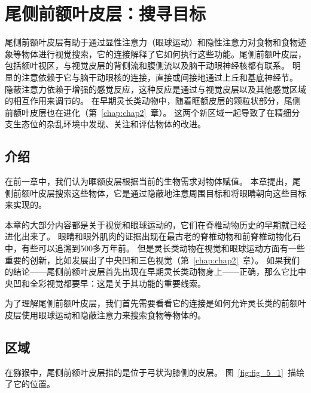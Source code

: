 \chapter{尾侧前额叶皮层：搜寻目标} \label{chap:chap5}

尾侧前额叶皮层有助于通过显性注意力（眼球运动）和隐性注意力对食物和食物迹象等物体进行视觉搜索，它的连接解释了它如何执行这些功能。尾侧前额叶皮层，包括额叶视区，与视觉皮层的背侧流和腹侧流以及脑干动眼神经核都有联系。
明显的注意依赖于它与脑干动眼核的连接，直接或间接地通过上丘和基底神经节。
隐蔽注意力依赖于增强的感觉反应，这种反应是通过与视觉皮层以及其他感觉区域的相互作用来调节的。
在早期灵长类动物中，随着眶额皮层的颗粒状部分，尾侧前额叶皮层也在进化（第~\ref{chap:chap2}~章）。
这两个新区域一起导致了在精细分支生态位的杂乱环境中发现、关注和评估物体的改进。



\section{介绍}

在前一章中，我们认为眶额皮层根据当前的生物需求对物体赋值。
本章提出，尾侧前额叶皮层搜索这些物体，它是通过隐蔽地注意周围目标和将眼睛朝向这些目标来实现的。


本章的大部分内容都是关于视觉和眼球运动的，它们在脊椎动物历史的早期就已经进化出来了。
眼睛和眼外肌肉的证据出现在最古老的脊椎动物和前脊椎动物化石中，有些可以追溯到500多万年前\cite{shu2003head}。
但是灵长类动物在视觉和眼球运动方面有一些重要的创新，比如发展出了中央凹和三色视觉（第~\ref{chap:chap2}~章）。
如果我们的结论——尾侧前额叶皮层首先出现在早期灵长类动物身上——正确，那么它比中央凹和全彩视觉都要早：这是关于其功能的重要线索。


为了理解尾侧前额叶皮层，我们首先需要看看它的连接是如何允许灵长类的前额叶皮层使用眼球运动和隐蔽注意力来搜索食物等物体的。



\section{区域}

在猕猴中，尾侧前额叶皮层指的是位于弓状沟膝侧的皮层。
图~\ref{fig:fig_5_1}~描绘了它的位置。



